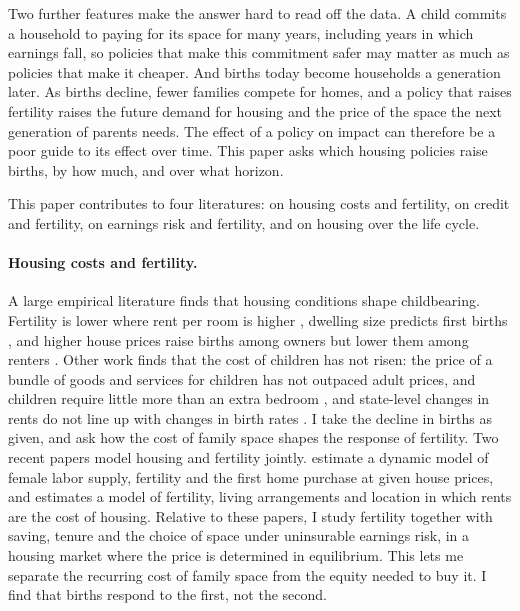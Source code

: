 Two further features make the answer hard to read off the data. A child
commits a household to paying for its space for many years, including years
in which earnings fall, so policies that make this commitment safer may
matter as much as policies that make it cheaper. And births today become
households a generation later. As births decline, fewer families compete for
homes, and a policy that raises fertility raises the future demand for
housing and the price of the space the next generation of parents needs. The
effect of a policy on impact can therefore be a poor guide to its effect over
time. This paper asks which housing policies raise births, by how much, and
over what horizon.


This paper contributes to four literatures: on housing costs and fertility, on credit and fertility, on earnings risk and fertility, and on housing over the life cycle.

\paragraph{Housing costs and fertility.}
A large empirical literature finds that housing conditions shape childbearing. Fertility is lower where rent per room is higher \citep{simonTamuraHigherRents2009}, dwelling size predicts first births \citep{stromHousingFirstBirths2010}, and higher house prices raise births among owners but lower them among renters \citep{dettlingHousePricesBirth2014,lovenheimFamilyWealthShocks2013}. Other work finds that the cost of children has not risen: the price of a bundle of goods and services for children has not outpaced adult prices, and children require little more than an extra bedroom \citep{pattersonSarsons2026}, and state-level changes in rents do not line up with changes in birth rates \citep{kearneyPuzzleFallingUS2022}. I take the decline in births as given, and ask how the cost of family space shapes the response of fertility. Two recent papers model housing and fertility jointly. \citet{khorunzhinaMillerAmericanDream2022} estimate a dynamic model of female labor supply, fertility and the first home purchase at given house prices, and \citet{couillardBuildBabyBuild2025} estimates a model of fertility, living arrangements and location in which rents are the cost of housing. Relative to these papers, I study fertility together with saving, tenure and the choice of space under uninsurable earnings risk, in a housing market where the price is determined in equilibrium. This lets me separate the recurring cost of family space from the equity needed to buy it. I find that births respond to the first, not the second.

